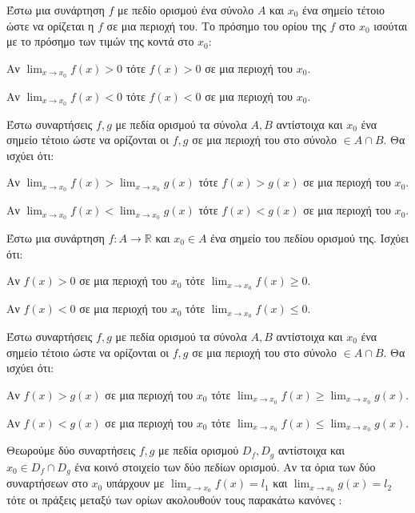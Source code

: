 \documentclass[twoside,nofonts,ektypwsh,math,spyros]{frontisthrio}
\begin{document}
Έστω μια συνάρτηση $ f $ με πεδίο ορισμού ένα σύνολο $ A $ και $ x_0 $ ένα σημείο τέτοιο ώστε να ορίζεται η $ f $ σε μια περιοχή του. Το πρόσημο του ορίου της $ f $ στο $ x_0 $ ισούται με το πρόσημο των τιμών της κοντά στο $ x_0 $:
\begin{rlist}
\item Αν $ {\displaystyle{\lim_{x\to x_0}{f(x)}}>0} $ τότε $ f(x)>0 $ σε μια περιοχή του $ x_0 $.
\item Αν $ {\displaystyle{\lim_{x\to x_0}{f(x)}}<0} $ τότε $ f(x)<0 $ σε μια περιοχή του $ x_0 $.
\end{rlist}
Έστω συναρτήσεις $ f,g $ με πεδία ορισμού τα σύνολα $ A,B $ αντίστοιχα και $ x_0 $ ένα σημείο τέτοιο ώστε να ορίζονται οι $ f,g $ σε μια περιοχή του στο σύνολο $\in A\cap B $. Θα ισχύει ότι:
\begin{rlist}
\item Αν $ {\displaystyle{\lim_{x\to x_0}{f(x)}}>\lim_{x\to x_0}{g(x)}} $ τότε $ f(x)>g(x) $ σε μια περιοχή του $ x_0 $.
\item Αν $ {\displaystyle{\lim_{x\to x_0}{f(x)}}<\lim_{x\to x_0}{g(x)}} $ τότε $ f(x)<g(x) $ σε μια περιοχή του $ x_0 $.
\end{rlist}
Έστω μια συνάρτηση $ f:A\to\mathbb{R} $ και $ x_0\in A $ ένα σημείο του πεδίου ορισμού της. Ισχύει ότι:
\begin{rlist}
\item Αν $ f(x)>0 $ σε μια περιοχή του $ x_0 $ τότε $ {\displaystyle{\lim_{x\to x_0}{f(x)}}\geq0} $.
\item Αν $ f(x)<0 $ σε μια περιοχή του $ x_0 $ τότε $ {\displaystyle{\lim_{x\to x_0}{f(x)}}\leq0} $.
\end{rlist}
Έστω συναρτήσεις $ f,g $ με πεδία ορισμού τα σύνολα $ A,B $ αντίστοιχα και $ x_0 $ ένα σημείο τέτοιο ώστε να ορίζονται οι $ f,g $ σε μια περιοχή του στο σύνολο $\in A\cap B $. Θα ισχύει ότι:
\begin{rlist}
\item Αν $ f(x)>g(x) $ σε μια περιοχή του $ x_0 $ τότε $ {\displaystyle{\lim_{x\to x_0}{f(x)}}\geq\lim_{x\to x_0}{g(x)}} $.
\item Αν $ f(x)<g(x) $ σε μια περιοχή του $ x_0 $ τότε $ {\displaystyle{\lim_{x\to x_0}{f(x)}}\leq\lim_{x\to x_0}{g(x)}} $.
\end{rlist}
Θεωρούμε δύο συναρτήσεις $ f,g $ με πεδία ορισμού $ D_f,D_g $ αντίστοιχα και $ x_0\in D_f\cap D_g $ ένα κοινό στοιχείο των δύο πεδίων ορισμού. Αν τα όρια των δύο συναρτήσεων στο $ x_0 $ υπάρχουν με $ \lim_{x\rightarrow x_0}{f(x)}=l_1 $ και $ \lim_{x\rightarrow x_0}{g(x)}=l_2 $ τότε οι πράξεις μεταξύ των ορίων ακολουθούν τους παρακάτω κανόνες :
\end{document}

